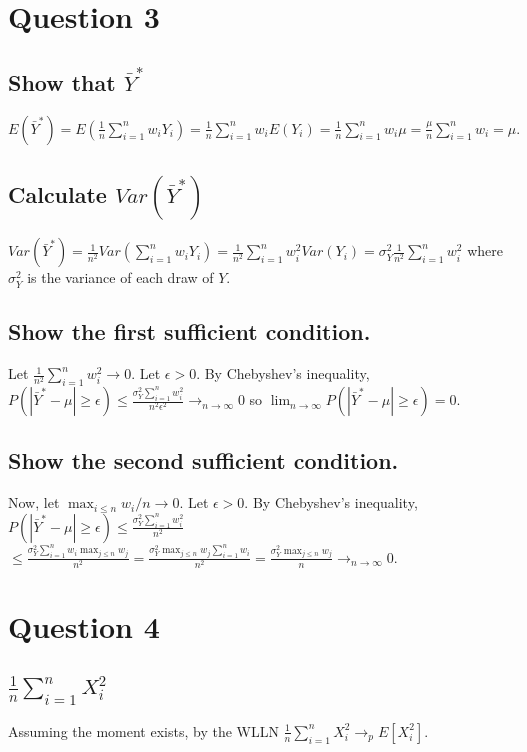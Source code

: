 \documentclass[11pt]{article} %
\begin{document}
\section{Question 3}
\subsection{Show that $\bar{Y}^{*}$}
$E(\bar{Y}^{*}) = E(\frac{1}{n}\sum_{i=1}^nw_iY_i) = \frac{1}{n}\sum_{i=1}^nw_iE(Y_i) =  \frac{1}{n}\sum_{i=1}^nw_i\mu =  \frac{\mu}{n}\sum_{i=1}^nw_i = \mu.$
\subsection{Calculate $Var(\bar{Y}^{*})$} %
$Var(\bar{Y}^{*}) =\frac{1}{n^2}Var(\sum_{i=1}^nw_iY_i)= \frac{1}{n^2}\sum_{i=1}^nw_i^2Var(Y_i) = \sigma_Y^2\frac{1}{n^2}\sum_{i=1}^nw_i^2$ where $\sigma_Y^2$ is the variance of each draw of $Y$.%
\subsection{Show the first sufficient condition.}
Let $\frac{1}{n^2}\sum_{i=1}^n w_i^2 \rightarrow 0.$ Let $\epsilon>0$. By Chebyshev's inequality, $P(|\bar{Y}^{*}-\mu|\geq \epsilon) \leq \frac{\sigma_Y^2\sum_{i=1}^nw_i^2}{n^2\epsilon^2} \rightarrow_{n\rightarrow \infty}0 $ so $\lim_{n\rightarrow \infty} P(|\bar{Y}^{*}-\mu|\geq \epsilon) = 0.$

\subsection{Show the second sufficient condition.}
Now, let $\max_{i\leq n}w_i/n \rightarrow 0$. Let $\epsilon>0$. By Chebyshev's inequality, $P(|\bar{Y}^{*}-\mu|\geq \epsilon) \leq \frac{\sigma_Y^2\sum_{i=1}^nw_i^2}{n^2} $\\$\leq \frac{\sigma_Y^2\sum_{i=1}^nw_i \max_{j\leq n}w_j}{n^2} = \frac{\sigma_Y^2\max_{j\leq n}w_j\sum_{i=1}^nw_i}{n^2} =  \frac{\sigma_Y^2\max_{j\leq n}w_j}{n} \rightarrow_{n\rightarrow \infty} 0. $

\section{Question 4}
\subsection{$\frac{1}{n}\sum_{i=1}^n X_i^2$}
Assuming the moment exists, by the WLLN $\frac{1}{n}\sum_{i=1}^n X_i^2 \rightarrow_p E[X_i^2]$.
\end{document}
